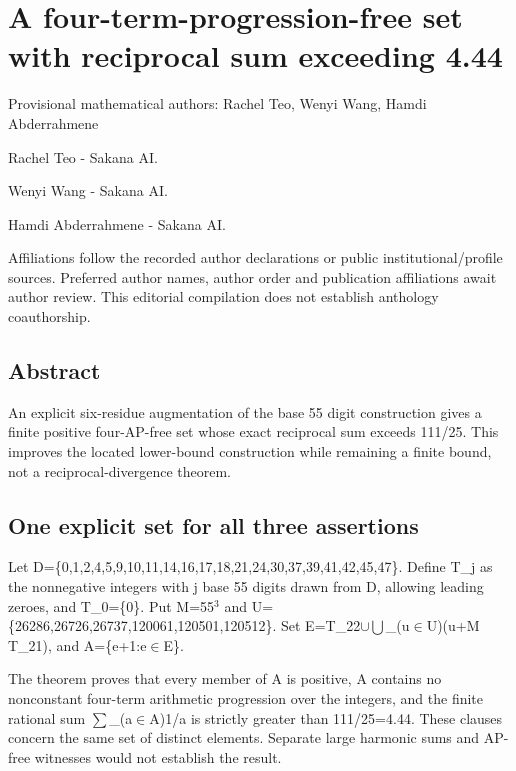 \documentclass[11pt,a4paper]{article}
\begin{document}
\section{A four-term-progression-free set with reciprocal sum exceeding 4.44}
{\small Provisional mathematical authors: Rachel Teo, Wenyi Wang, Hamdi Abderrahmene\par}\medskip
{\small Rachel Teo  -  Sakana AI.\par}

{\small Wenyi Wang  -  Sakana AI.\par}

{\small Hamdi Abderrahmene  -  Sakana AI.\par}

{\small Affiliations follow the recorded author declarations or public institutional/profile sources. Preferred author names, author order and publication affiliations await author review. This editorial compilation does not establish anthology coauthorship.\par}

\subsection{Abstract}
An explicit six-residue augmentation of the base 55 digit construction gives a finite positive four-AP-free set whose exact reciprocal sum exceeds 111/25. This improves the located lower-bound construction while remaining a finite bound, not a reciprocal-divergence theorem.

\subsection{One explicit set for all three assertions}
Let D=\{0,1,2,4,5,9,10,11,14,16,17,18,21,24,30,37,39,41,42,45,47\}. Define T\_j as the nonnegative integers with j base 55 digits drawn from D, allowing leading zeroes, and T\_0=\{0\}. Put M=55\ensuremath{^3} and U=\{26286,26726,26737,120061,120501,120512\}. Set E=T\_22\ensuremath{\cup}\ensuremath{\bigcup}\_(u\ensuremath{\in}U)(u+M T\_21), and A=\{e+1:e\ensuremath{\in}E\}.

The theorem proves that every member of A is positive, A contains no nonconstant four-term arithmetic progression over the integers, and the finite rational sum \ensuremath{\sum}\_(a\ensuremath{\in}A)1/a is strictly greater than 111/25=4.44. These clauses concern the same set of distinct elements. Separate large harmonic sums and AP-free witnesses would not establish the result.
\end{document}
